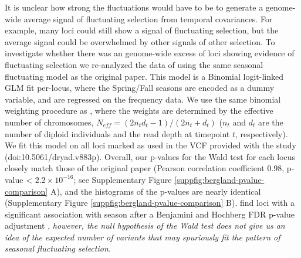 \documentclass[11pt]{article}
\newcommand{\vb}[1]{{\it \color{blue} #1}}
\begin{document}
It is unclear how strong the fluctuations would have to be to generate a
genome-wide average signal of fluctuating selection from temporal covariances.
For example, many loci could still show a signal of fluctuating selection, but
the average signal could be overwhelmed by other signals of other selection. To
investigate whether there was an genome-wide excess of loci showing evidence of
fluctuating selection we re-analyzed the data of \parencite{Bergland2014-ij}
using the same seasonal fluctuating model as the original paper. This model is
a Binomial logit-linked GLM fit per-locus, where the Spring/Fall seasons are
encoded as a dummy variable, and are regressed on the frequency data. We use
the same binomial weighting procedure as \textcite{Bergland2014-ij}, where the
weights are determined by the effective number of chromosomes, $N_{eff} = (2
n_t d_t - 1) / (2 n_t + d_t)$ ($n_t$ and $d_t$ are the number of diploid
individuals and the read depth at timepoint $t$, respectively). We fit this
model on all loci marked as used in the VCF provided with the
\textcite{Bergland2014-ij} study (doi:10.5061/dryad.v883p). Overall, our
p-values for the Wald test for each locus closely match those of the original
paper (Pearson correlation coefficient 0.98, p-value < $2.2 \times 10^{-16}$;
see Supplementary Figure \ref{suppfig:bergland-pvalue-comparison} A), and the
histograms of the p-values are nearly identical (Supplementary Figure
\ref{suppfig:bergland-pvalue-comparison} B). \textcite{Bergland2014-ij} find
loci with a significant association with season after a Benjamini and Hochberg
FDR p-value adjustment \parencite{Benjamini1995-jy}, \vb{however, the null
hypothesis of the Wald test does not give us an idea of the expected number of
variants that may spuriously fit the pattern of seasonal fluctuating
selection.}
\end{document}
